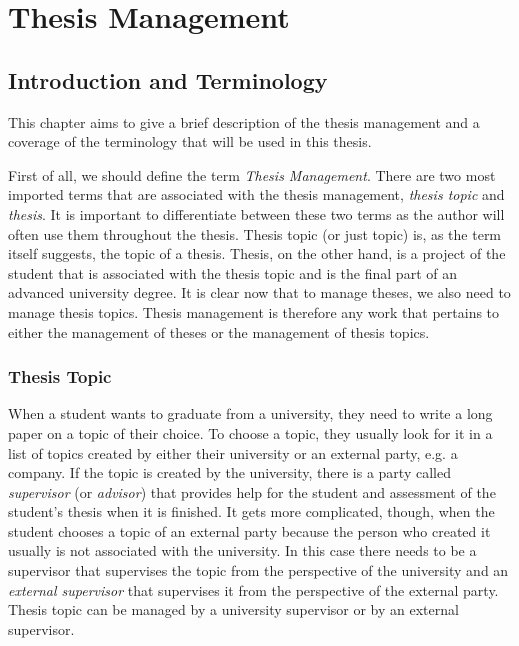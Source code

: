 \chapter{Thesis Management}

\section{Introduction and Terminology}

This chapter aims to give a brief description of the thesis management and a coverage of the terminology that will be used in this thesis.

First of all, we should define the term \emph{Thesis Management}. There are two most imported terms that are associated with the thesis management, \emph{thesis topic} and \emph{thesis}. It is important to differentiate between these two terms as the author will often use them throughout the thesis. Thesis topic (or just topic) is, as the term itself suggests, the topic of a thesis. Thesis, on the other hand, is a project of the student that is associated with the thesis topic and is the final part of an advanced university degree. It is clear now that to manage theses, we also need to manage thesis topics. Thesis management is therefore any work that pertains to either the management of theses or the management of thesis topics.

\subsection{Thesis Topic}

When a student wants to graduate from a university, they need to write a long paper on a topic of their choice. To choose a topic, they usually look for it in a list of topics created by either their university or an external party, e.g. a company. If the topic is created by the university, there is a party called \emph{supervisor} (or \emph{advisor}) that provides help for the student and assessment of the student's thesis when it is finished. It gets more complicated, though, when the student chooses a topic of an external party because the person who created it usually is not associated with the university. In this case there needs to be a supervisor that supervises the topic from the perspective of the university and an \emph{external supervisor} that supervises it from the perspective of the external party. Thesis topic can be managed by a university supervisor or by an external supervisor.

